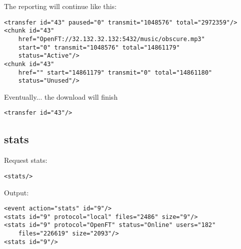 \documentclass[10pt]{article}
\begin{document}
The reporting will continue like this:
\begin{verbatim}
<transfer id="43" paused="0" transmit="1048576" total="2972359"/>
<chunk id="43"
    href="OpenFT://32.132.32.132:5432/music/obscure.mp3"
    start="0" transmit="1048576" total="14861179"
    status="Active"/>
<chunk id="43"
    href="" start="14861179" transmit="0" total="14861180"
    status="Unused"/>
\end{verbatim}

Eventually... the download will finish
\begin{verbatim}
<transfer id="43"/> 
\end{verbatim}

\subsection{stats}
Request stats:
\begin{verbatim}
<stats/>
\end{verbatim}

Output:
\begin{verbatim}
<event action="stats" id="9"/>
<stats id="9" protocol="local" files="2486" size="9"/>
<stats id="9" protocol="OpenFT" status="Online" users="182"
    files="226619" size="2093"/>
<stats id="9"/>
\end{verbatim}
\end{document}
